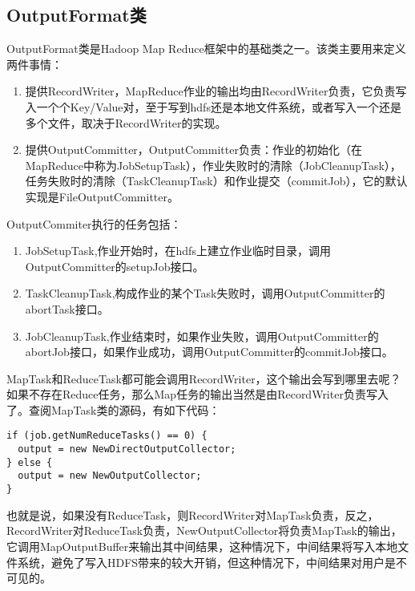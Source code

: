 \subsection{OutputFormat类}
OutputFormat类是Hadoop Map Reduce框架中的基础类之一。该类主要用来定义两件事情：
\begin{enumerate}[(1)]
\item 提供RecordWriter，MapReduce作业的输出均由RecordWriter负责，它负责写入一个个Key/Value对，至于写到hdfs还是本地文件系统，或者写入一个还是多个文件，取决于RecordWriter的实现。
\item 提供OutputCommitter，OutputCommitter负责：作业的初始化（在MapReduce中称为JobSetupTask），作业失败时的清除（JobCleanupTask），任务失败时的清除（TaskCleanupTask）和作业提交（commitJob），它的默认实现是FileOutputCommitter。
\end{enumerate}
\par OutputCommiter执行的任务包括：
\begin{enumerate}[(1)]
\item JobSetupTask,作业开始时，在hdfs上建立作业临时目录，调用OutputCommitter的setupJob接口。
\item TaskCleanupTask,构成作业的某个Task失败时，调用OutputCommitter的abortTask接口。
\item JobCleanupTask,作业结束时，如果作业失败，调用OutputCommitter的abortJob接口，如果作业成功，调用OutputCommitter的commitJob接口。
\end{enumerate}
\par MapTask和ReduceTask都可能会调用RecordWriter，这个输出会写到哪里去呢？如果不存在Reduce任务，那么Map任务的输出当然是由RecordWriter负责写入了。查阅MapTask类的源码，有如下代码：
\begin{verbatim}
if (job.getNumReduceTasks() == 0) {
  output = new NewDirectOutputCollector;
} else {
  output = new NewOutputCollector;
}
\end{verbatim}
\par 也就是说，如果没有ReduceTask，则RecordWriter对MapTask负责，反之，RecordWriter对ReduceTask负责，NewOutputCollector将负责MapTask的输出，它调用MapOutputBuffer来输出其中间结果，这种情况下，中间结果将写入本地文件系统，避免了写入HDFS带来的较大开销，但这种情况下，中间结果对用户是不可见的。
